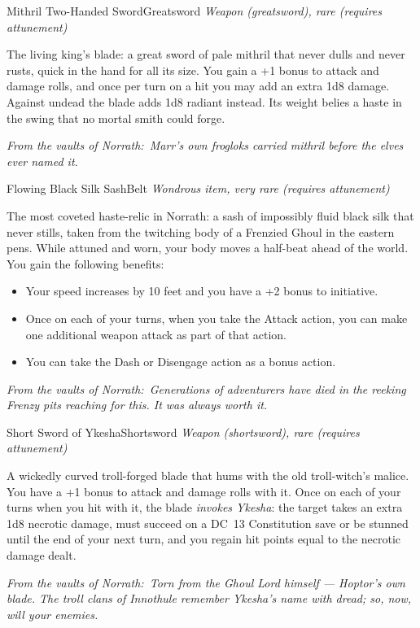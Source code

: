 \documentclass[10pt,twoside]{report}
\newcommand{\itemtype}[1]{{\itshape #1}\par\vspace{2pt}{\color{gukgold!70!black}\rule{\linewidth}{0.6pt}}\par\vspace{2pt}}
\newcommand{\eqnote}[1]{\par\vspace{3pt}{\color{gukgold!70!black}\rule{\linewidth}{0.5pt}}\par
  {\footnotesize\itshape\color{gukstone}From the vaults of Norrath:~#1}\par}
\newcommand{\dc}[1]{DC~#1}
\begin{document}
\begin{itemcard}{Mithril Two-Handed Sword}{Greatsword}
\itemtype{Weapon (greatsword), rare (requires attunement)}
The living king's blade: a great sword of pale mithril that never dulls and never rusts, quick in the hand for all its size. You gain a +1 bonus to attack and damage rolls, and once per turn on a hit you may add an extra 1d8 damage. Against undead the blade adds 1d8 radiant instead. Its weight belies a haste in the swing that no mortal smith could forge.
\eqnote{Marr's own frogloks carried mithril before the elves ever named it.}
\end{itemcard}


\begin{itemcard}{Flowing Black Silk Sash}{Belt}
\itemtype{Wondrous item, very rare (requires attunement)}
The most coveted haste-relic in Norrath: a sash of impossibly fluid black silk that never stills, taken from the twitching body of a Frenzied Ghoul in the eastern pens. While attuned and worn, your body moves a half-beat ahead of the world. You gain the following benefits:
\begin{itemize}
\item Your speed increases by 10 feet and you have a +2 bonus to initiative.
\item Once on each of your turns, when you take the Attack action, you can make one additional weapon attack as part of that action.
\item You can take the Dash or Disengage action as a bonus action.
\end{itemize}
\eqnote{Generations of adventurers have died in the reeking Frenzy pits reaching for this. It was always worth it.}
\end{itemcard}

\begin{itemcard}{Short Sword of Ykesha}{Shortsword}
\itemtype{Weapon (shortsword), rare (requires attunement)}
A wickedly curved troll-forged blade that hums with the old troll-witch's malice. You have a +1 bonus to attack and damage rolls with it. Once on each of your turns when you hit with it, the blade \emph{invokes Ykesha}: the target takes an extra 1d8 necrotic damage, must succeed on a \dc{13} Constitution save or be stunned until the end of your next turn, and you regain hit points equal to the necrotic damage dealt.
\eqnote{Torn from the Ghoul Lord himself --- Hoptor's own blade. The troll clans of Innothule remember Ykesha's name with dread; so, now, will your enemies.}
\end{itemcard}
\end{document}
